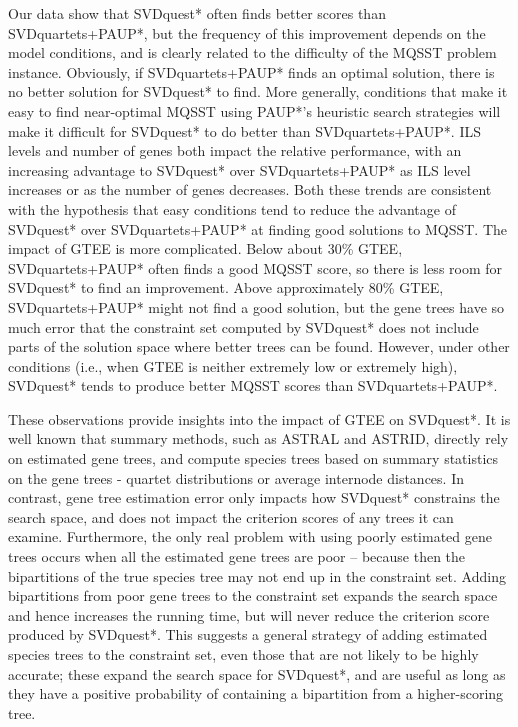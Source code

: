 Our data show that SVDquest* often finds better scores than SVDquartets+PAUP*, but
the frequency of this improvement  depends on the model conditions, and is clearly related to the difficulty
of the MQSST problem instance. 
Obviously, if
SVDquartets+PAUP* finds an optimal solution,  there is no better solution
for SVDquest* to find.
More generally,  conditions that make it easy to find near-optimal MQSST using PAUP*'s heuristic search
strategies will make it difficult for SVDquest* to do better than SVDquartets+PAUP*. 
ILS levels and number of genes both impact the relative performance, with an increasing advantage to
SVDquest* over SVDquartets+PAUP* as ILS level increases or as the number of genes decreases. 
Both these trends are consistent with the hypothesis that easy conditions tend to reduce the advantage of SVDquest* over SVDquartets+PAUP* at
finding good solutions to MQSST.
The impact of GTEE is more complicated. 
Below about 30\% GTEE, SVDquartets+PAUP*
often finds a good MQSST score, so there is less room for SVDquest* to
find an improvement.  
Above approximately 80\% GTEE,
 SVDquartets+PAUP* might not find a good solution, but the gene trees
have so much error that the constraint set computed by SVDquest* does
not include parts of the solution space where better trees can be
found.
However, under other conditions (i.e., 
when GTEE
is neither extremely low or extremely high),
 SVDquest* tends to produce better MQSST scores than SVDquartets+PAUP*.



These observations provide insights into the impact of
GTEE on SVDquest*.
It is well known that summary methods, such as
ASTRAL and ASTRID,
directly rely on estimated gene trees, and
compute  species trees 
based on summary statistics on the gene trees - quartet
distributions or average internode distances.  In contrast, gene tree
estimation error only impacts how SVDquest* constrains the search
space, and does not impact the criterion scores of any trees it can
examine.  Furthermore, the only real problem with using poorly
estimated gene trees occurs when all the estimated gene trees are poor
-- because then the bipartitions of the true species tree may not end
up in the constraint set. 
Adding bipartitions from poor gene trees to  the constraint set
 expands the search space
and hence increases the running time, but will never reduce the
criterion score produced by SVDquest*.  
This suggests a general
strategy of adding estimated species trees to the constraint set, even those that are not
likely to be highly accurate; these expand the search space for
SVDquest*, and are useful as long as they have a positive probability of containing a
bipartition from a higher-scoring tree.



